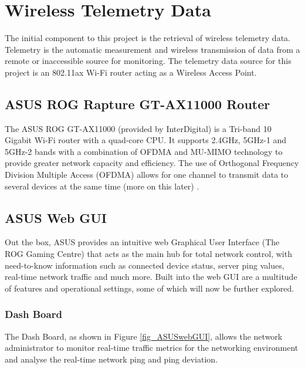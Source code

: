 \section{Wireless Telemetry Data} \label{section:WirelessTelemetryResearch}

The initial component to this project is the retrieval of wireless telemetry data. Telemetry is the automatic measurement and wireless transmission of data from a remote or inaccessible source for monitoring. The telemetry data source for this project is an 802.11ax Wi-Fi router acting as a Wireless Access Point. 

\subsection{ASUS ROG Rapture GT-AX11000 Router}

The ASUS ROG GT-AX11000 (provided by InterDigital) is a Tri-band 10 Gigabit Wi-Fi router with a quad-core CPU. It supports 2.4GHz, 5GHz-1 and 5GHz-2 bands with a combination of OFDMA and MU-MIMO technology to provide greater network capacity and efficiency. The use of Orthogonal Frequency Division Multiple Access (OFDMA) allows for one channel to transmit data to several devices at the same time (more on this later) \cite{OFDMA}. 

\subsection{ASUS Web GUI}

Out the box, ASUS provides an intuitive web Graphical User Interface (The ROG Gaming Centre) that acts as the main hub for total network control, with need-to-know information such as connected device status, server ping values, real-time network traffic and much more. Built into the web GUI are a multitude of features and operational settings, some of which will now be further explored. 

\subsubsection{Dash Board}

The Dash Board, as shown in Figure \ref{fig_ASUSwebGUI}, allows the network administrator to monitor real-time traffic metrics for the networking environment and analyse the real-time network ping and ping deviation.


